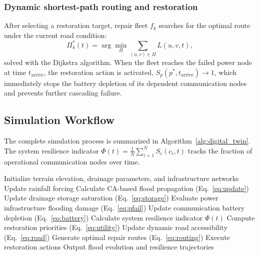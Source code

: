 \documentclass[preprint,12pt]{elsarticle}
\begin{document}
\subsubsection{Dynamic shortest-path routing and restoration}
After selecting a restoration target, repair fleet $f_k$ searches for the
optimal route under the current road condition:
\begin{equation}\label{eq:routing}
\Pi_k^{*}(t) = \arg\min_{\Pi} \sum_{(u,v)\in\Pi} L(u,v,t),
\end{equation}
solved with the Dijkstra algorithm. When the fleet reaches the failed power
node at time $t_{\mathrm{arrive}}$, the restoration action is activated,
$S_p(p^{*}, t_{\mathrm{arrive}}) \rightarrow 1$, which immediately stops the
battery depletion of its dependent communication nodes and prevents further
cascading failure.

\subsection{Simulation Workflow}
The complete simulation process is summarized in
Algorithm~\ref{alg:digital_twin}. The system resilience indicator
$\Phi(t) = \frac{1}{N}\sum_{i=1}^{N} S_c(c_i,t)$ tracks the fraction of
operational communication nodes over time.

\begin{algorithm}[H]
\caption{High-resolution urban resilience digital twin simulation}
\label{alg:digital_twin}
\begin{algorithmic}[1]
\State Initialize terrain elevation, drainage parameters, and infrastructure networks
  \State Update rainfall forcing
  \State Calculate CA-based flood propagation (Eq.~\ref{eq:update})
  \State Update drainage storage saturation (Eq.~\ref{eq:storage})
  \State Evaluate power infrastructure flooding damage (Eq.~\ref{eq:pfail})
  \State Update communication battery depletion (Eq.~\ref{eq:battery})
  \State Calculate system resilience indicator $\Phi(t)$
    \State Compute restoration priorities (Eq.~\ref{eq:utility})
    \State Update dynamic road accessibility (Eq.~\ref{eq:road})
    \State Generate optimal repair routes (Eq.~\ref{eq:routing})
    \State Execute restoration actions
  \EndIf
\EndFor
\State Output flood evolution and resilience trajectories
\end{algorithmic}
\end{algorithm}

\end{document}
